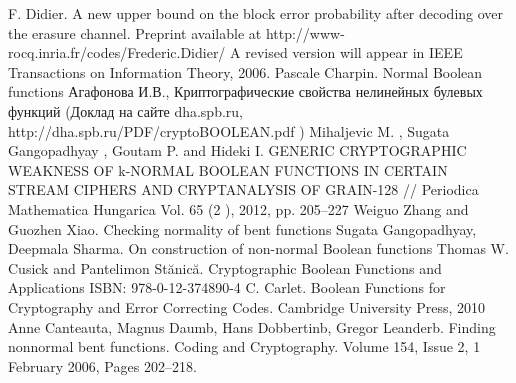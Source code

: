 \begin{thebibliography}{99}
 F. Didier. A new upper bound on the block error probability after decoding over the erasure channel. Preprint available at http://www-rocq.inria.fr/codes/Frederic.Didier/ A revised version will appear in IEEE Transactions on Information Theory, 2006.
 Pascale Charpin. Normal Boolean functions
 Агафонова И.В., Криптографические свойства нелинейных булевых функций (Доклад на сайте dha.spb.ru, http://dha.spb.ru/PDF/cryptoBOOLEAN.pdf )
 Mihaljevic M. , Sugata Gangopadhyay , Goutam P. and Hideki I. GENERIC CRYPTOGRAPHIC WEAKNESS OF k-NORMAL BOOLEAN FUNCTIONS IN CERTAIN STREAM CIPHERS AND CRYPTANALYSIS OF GRAIN-128 // Periodica Mathematica Hungarica Vol. 65 (2 ), 2012, pp. 205–227
 Weiguo Zhang and Guozhen Xiao. Checking normality of bent functions
 Sugata Gangopadhyay, Deepmala Sharma. On construction of non-normal Boolean functions
 Thomas W. Cusick and Pantelimon Stănică. Cryptographic Boolean Functions and Applications ISBN: 978-0-12-374890-4
 C. Carlet. Boolean Functions for Cryptography and Error Correcting Codes. Cambridge University Press, 2010
 Anne Canteauta, Magnus Daumb, Hans Dobbertinb, Gregor Leanderb. Finding nonnormal bent functions. Coding and Cryptography. Volume 154, Issue 2, 1 February 2006, Pages 202–218.







\end{thebibliography}
